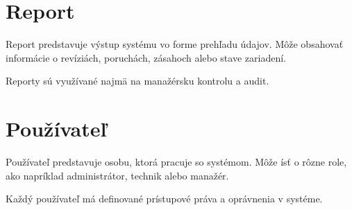 \section{Report}

Report predstavuje výstup systému vo forme prehľadu údajov. Môže obsahovať informácie o revíziách, poruchách, zásahoch alebo stave zariadení.

Reporty sú využívané najmä na manažérsku kontrolu a audit.

\section{Používateľ}

Používateľ predstavuje osobu, ktorá pracuje so systémom. Môže ísť o rôzne role, ako napríklad administrátor, technik alebo manažér.

Každý používateľ má definované prístupové práva a oprávnenia v systéme.
